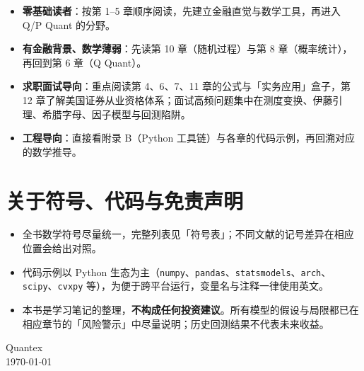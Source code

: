 \begin{itemize}[leftmargin=1.8em]
  \item \textbf{零基础读者}：按第 1--5 章顺序阅读，先建立金融直觉与数学工具，再进入 Q/P Quant 的分野。
  \item \textbf{有金融背景、数学薄弱}：先读第 10 章（随机过程）与第 8 章（概率统计），再回到第 6 章（Q Quant）。
  \item \textbf{求职面试导向}：重点阅读第 4、6、7、11 章的公式与「实务应用」盒子，第 12 章了解美国证券从业资格体系；面试高频问题集中在测度变换、伊藤引理、希腊字母、因子模型与回测陷阱。
  \item \textbf{工程导向}：直接看附录 B（Python 工具链）与各章的代码示例，再回溯对应的数学推导。
\end{itemize}

\section*{关于符号、代码与免责声明}

\begin{itemize}[leftmargin=1.8em]
  \item 全书数学符号尽量统一，完整列表见「符号表」；不同文献的记号差异在相应位置会给出对照。
  \item 代码示例以 Python 生态为主（\texttt{numpy}、\texttt{pandas}、\texttt{statsmodels}、\texttt{arch}、\texttt{scipy}、\texttt{cvxpy} 等），为便于跨平台运行，变量名与注释一律使用英文。
  \item 本书是学习笔记的整理，\textbf{不构成任何投资建议}。所有模型的假设与局限都已在相应章节的「风险警示」中尽量说明；历史回测结果不代表未来收益。
\end{itemize}

\vspace{1.2em}
\begin{flushright}
  \sffamily Quantex\\
  \sffamily \today
\end{flushright}

\clearpage
